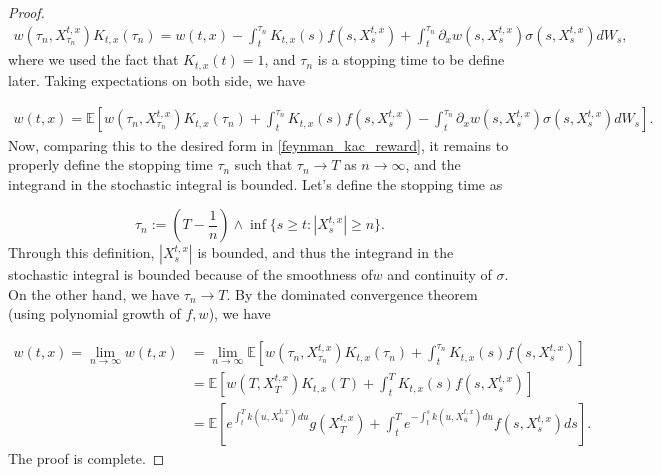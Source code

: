 \documentclass{article}
\begin{document}
\begin{proof}
\begin{equation*}
\begin{aligned}
w(\tau_n,X_{\tau_n}^{t,x})K_{t,x}(\tau_n)=w(t,x)-\int_t^{\tau_n}K_{t,x}(s)f(s,X_s^{t,x})+\int_t^{\tau_n}\partial_xw(s,X_s^{t,x})\sigma(s,X_s^{t,x})dW_s,
\end{aligned}
\end{equation*}
where we used the fact that $K_{t,x}(t)=1$, and $\tau_n$ is a stopping time to be define later. Taking expectations on both side, we have

\begin{equation*}
\begin{aligned}
w(t,x)=\mathbb{E}\left[w(\tau_n,X_{\tau_n}^{t,x})K_{t,x}(\tau_n)+\int_t^{\tau_n}K_{t,x}(s)f(s,X_s^{t,x})-\int_t^{\tau_n}\partial_xw(s,X_s^{t,x})\sigma(s,X_s^{t,x})dW_s\right].
\end{aligned}
\end{equation*}
Now, comparing this to the desired form in \eqref{feynman_kac_reward}, it remains to properly define the stopping time $\tau_n$ such that $\tau_n\rightarrow T$ as $n\rightarrow\infty$, and the integrand in the stochastic integral is bounded. Let's define the stopping time as

\begin{equation*}
\tau_n:=(T-\frac{1}{n})\wedge \inf \{s\geq t:|X_s^{t,x}|\geq n\}.
\end{equation*}
Through this definition, $|X_s^{t,x}|$ is bounded, and thus the integrand in the stochastic integral is bounded because of the smoothness of$w$ and continuity of $\sigma$. On the other hand, we have $\tau_n\rightarrow T$. By the dominated convergence theorem (using polynomial growth of $f,w$), we have

\begin{equation*}
\begin{aligned}
w(t,x)=\lim_{n\rightarrow\infty}w(t,x)&=\lim_{n\rightarrow\infty}\mathbb{E}\left[w(\tau_n,X_{\tau_n}^{t,x})K_{t,x}(\tau_n)+\int_t^{\tau_n}K_{t,x}(s)f(s,X_s^{t,x})\right]\\
&=\mathbb{E}\left[w(T,X_{T}^{t,x})K_{t,x}(T)+\int_t^{T}K_{t,x}(s)f(s,X_s^{t,x})\right]\\
&=\mathbb{E}\left[e^{\int_t^Tk(u,X_u^{t,x})du}g(X_T^{t,x})+\int^T_te^{-\int^s_tk(u,X_u^{t,x})du}f(s,X_s^{t,x})ds\right].
\end{aligned}
\end{equation*}
The proof is complete.
\end{proof}
\end{document}
